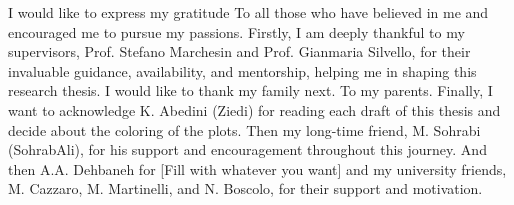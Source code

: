 I would like to express my gratitude To all those who have believed in me and encouraged me to pursue my passions.
Firstly, I am deeply thankful to my supervisors, Prof. Stefano Marchesin and Prof. Gianmaria Silvello, for their invaluable guidance, availability, and mentorship, helping me in shaping this research thesis.
I would like to thank my family next.
To my parents.
Finally, I want to acknowledge K. Abedini (\ie Ziedi) for reading each draft of this thesis and decide about the coloring of the plots. Then my long-time friend, M. Sohrabi (\ie SohrabAli), for his support and encouragement throughout this journey.
And then A.A. Dehbaneh for [Fill with whatever you want] and my university friends, M. Cazzaro, M. Martinelli, and N. Boscolo, for their support and motivation.